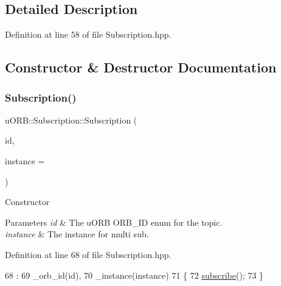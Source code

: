 \subsection{Detailed Description}


Definition at line 58 of file Subscription.\+hpp.



\subsection{Constructor \& Destructor Documentation}
\mbox{\label{classuORB_1_1Subscription_a6afd37f8aa13bc3ffeafd29b7a3d434f}} 
\subsubsection{\texorpdfstring{Subscription()}{Subscription()}\hspace{0.1cm}{\footnotesize\ttfamily [1/2]}}
{\footnotesize\ttfamily u\+O\+R\+B\+::\+Subscription\+::\+Subscription (\begin{DoxyParamCaption}\item[{\hyperlink{uORB_8h_a96af5434ec1acdf24287bd7851b0413f}{O\+R\+B\+\_\+\+ID}}]{id,  }\item[{uint8\+\_\+t}]{instance = {} }\end{DoxyParamCaption})\hspace{0.3cm}{\ttfamily [inline]}}

Constructor


\begin{DoxyParams}{Parameters}
{\em id} & The u\+O\+RB O\+R\+B\+\_\+\+ID enum for the topic. \\
\hline
{\em instance} & The instance for multi sub. \\
\hline
\end{DoxyParams}


Definition at line 68 of file Subscription.\+hpp.


\begin{DoxyCode}
68                                                   :
69         \_orb\_id(\textcolor{keywordtype}{id}),
70         \_instance(instance)
71     \{
72         \hyperlink{classuORB_1_1Subscription_acb0fbd4b56d5e3c8edca15206e110223}{subscribe}();
73     \}
\end{DoxyCode}
\mbox{\label{classuORB_1_1Subscription_a8851d25ec7fc746ed71214cb65500006}} 
